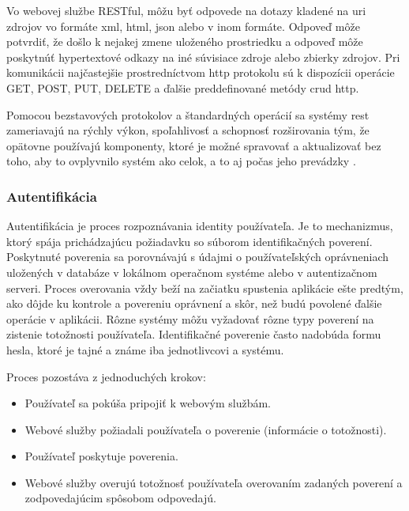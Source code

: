 Vo webovej službe RESTful, môžu byť odpovede na dotazy kladené na \acrshort{uri} zdrojov vo formáte
\acrshort{xml}, \acrshort{html}, \acrshort{json} alebo v inom formáte. Odpoveď môže potvrdiť, že došlo k nejakej zmene
uloženého prostriedku a odpoveď môže poskytnúť hypertextové odkazy na iné súvisiace zdroje
alebo zbierky zdrojov. Pri komunikácii najčastejšie prostredníctvom \acrshort{http} protokolu sú k dispozícii
operácie GET, POST, PUT, DELETE a ďalšie preddefinované metódy \acrshort{crud} \acrshort{http}.

Pomocou bezstavových protokolov a štandardných operácií sa systémy \acrshort{rest} zameriavajú na
rýchly výkon, spoľahlivosť a schopnosť rozširovania tým, že opätovne používajú komponenty,
ktoré je možné spravovať a aktualizovať bez toho, aby to ovplyvnilo systém ako celok,
a to aj počas jeho prevádzky \cite{fielding}.

\subsubsection{Autentifikácia}
\label{subsubsec:authentification}

Autentifikácia je proces rozpoznávania identity používateľa. Je to mechanizmus, ktorý
spája prichádzajúcu požiadavku so súborom identifikačných poverení. Poskytnuté poverenia
sa porovnávajú s údajmi o používateľských oprávneniach uložených v databáze v lokálnom
operačnom systéme alebo v autentizačnom serveri. Proces overovania vždy beží na začiatku
spustenia aplikácie ešte predtým, ako dôjde ku kontrole a povereniu oprávnení a skôr, než budú
povolené ďalšie operácie v aplikácii. Rôzne systémy môžu vyžadovať rôzne typy poverení
na zistenie totožnosti používateľa. Identifikačné poverenie často nadobúda formu hesla, ktoré je
tajné a známe iba jednotlivcovi a systému.

Proces pozostáva z jednoduchých krokov:
\begin{itemize}
\item Používateľ sa pokúša pripojiť k webovým službám.
\item Webové služby požiadali používateľa o poverenie (informácie o totožnosti).
\item Používateľ poskytuje poverenia.
\item Webové služby overujú totožnosť používateľa overovaním zadaných poverení a zodpovedajúcim
spôsobom odpovedajú.
\end{itemize}

